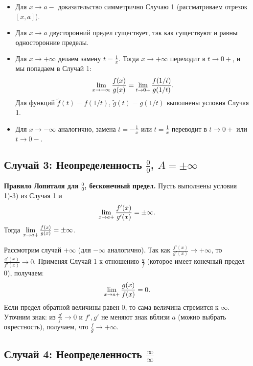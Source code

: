 \begin{Proof}
    \begin{itemize}
        \item Для \(x \to a-\) доказательство симметрично Случаю 1 (рассматриваем отрезок \([x, a]\)).
        \item Для \(x \to a\) двусторонний предел существует, так как существуют и равны односторонние пределы.
        \item Для \(x \to +\infty\) делаем замену \(t = \frac{1}{x}\). Тогда \(x \to +\infty\) переходит в \(t \to 0+\), и мы попадаем в Случай 1:
        \[
        \lim\limits_{x \to +\infty} \frac{f(x)}{g(x)} = \lim\limits_{t \to 0+} \frac{f(1/t)}{g(1/t)}.
        \]
        Для функций \(\tilde{f}(t) = f(1/t)\), \(\tilde{g}(t) = g(1/t)\) выполнены условия Случая 1.
        \item Для \(x \to -\infty\) аналогично, замена \(t = -\frac{1}{x}\) или \(t = \frac{1}{x}\) переводит в \(t \to 0+\) или \(t \to 0-\).
    \end{itemize}
\end{Proof}

\subsection{Случай 3: Неопределенность \(\displaystyle \frac{0}{0}\), \(A = \pm\infty\)}

\begin{theorem}
\textbf{Правило Лопиталя для \(\frac{0}{0}\), бесконечный предел.}
    Пусть выполнены условия 1)-3) из Случая 1 и
    \[
    \lim\limits_{x \to a+} \frac{f'(x)}{g'(x)} = \pm\infty.
    \]
    Тогда \(\lim\limits_{x \to a+} \frac{f(x)}{g(x)} = \pm\infty\).
\end{theorem}

\begin{Proof}
    Рассмотрим случай \(+\infty\) (для \(-\infty\) аналогично). Так как \(\frac{f'(x)}{g'(x)} \to +\infty\), то \(\frac{g'(x)}{f'(x)} \to 0\). Применяя Случай 1 к отношению \(\frac{g}{f}\) (которое имеет конечный предел 0), получаем:
    \[
    \lim\limits_{x \to a+} \frac{g(x)}{f(x)} = 0.
    \]
    Если предел обратной величины равен 0, то сама величина стремится к \(\infty\). Уточним знак: из \(\frac{g'}{f'} \to 0\) и \(f', g'\) не меняют знак вблизи \(a\) (можно выбрать окрестность), получаем, что \(\frac{f}{g} \to +\infty\).
\end{Proof}

\subsection{Случай 4: Неопределенность \(\displaystyle \frac{\infty}{\infty}\)}

